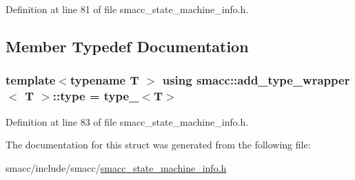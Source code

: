 Definition at line 81 of file smacc\+\_\+state\+\_\+machine\+\_\+info.\+h.



\subsection{Member Typedef Documentation}
\subsubsection[{\texorpdfstring{type}{type}}]{\setlength{\rightskip}{0pt plus 5cm}template$<$typename T $>$ using {\bf smacc\+::add\+\_\+type\+\_\+wrapper}$<$ T $>$\+::{\bf type} =  {\bf type\+\_\+}$<$T$>$}\hypertarget{structsmacc_1_1add__type__wrapper_a3e5af90e35b5a70d9c4d952ef8011da9}{}\label{structsmacc_1_1add__type__wrapper_a3e5af90e35b5a70d9c4d952ef8011da9}


Definition at line 83 of file smacc\+\_\+state\+\_\+machine\+\_\+info.\+h.



The documentation for this struct was generated from the following file\+:\begin{DoxyCompactItemize}
\item 
smacc/include/smacc/\hyperlink{smacc__state__machine__info_8h}{smacc\+\_\+state\+\_\+machine\+\_\+info.\+h}\end{DoxyCompactItemize}
